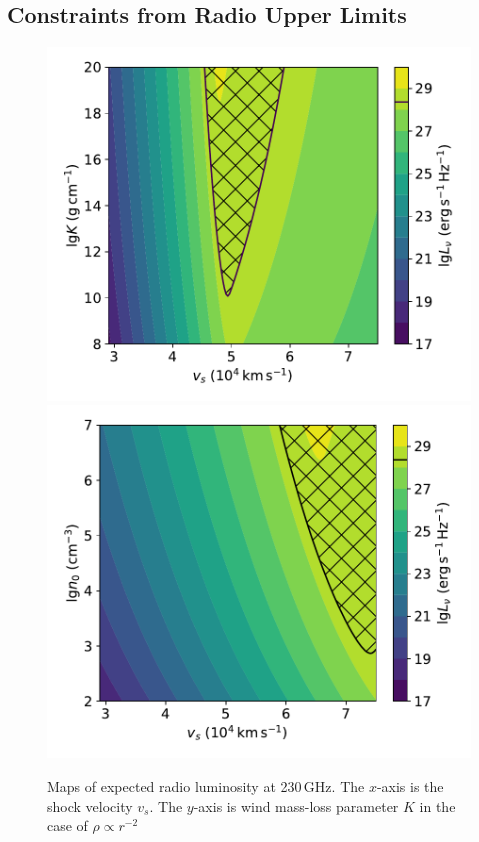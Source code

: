 \documentclass[twocolumn]{aastex63}
\begin{document}
\begin{CJK*}{UTF8}{gbsn}
\subsection{Constraints from Radio Upper Limits}
\begin{figure}[htbp!]
	\centering
	\includegraphics[width=\columnwidth]{figures/radio_230GHz_s2.pdf}
	\includegraphics[width=\columnwidth]{figures/radio_230GHz_s0.pdf}
	\caption{Maps of expected radio luminosity at 230\,GHz. The $x$-axis is the shock velocity $v_s$. 
	The $y$-axis is wind mass-loss parameter $K$ in the case of $\rho \propto r^{-2}$ 
}
\end{figure}
\end{CJK*}
\end{document}
